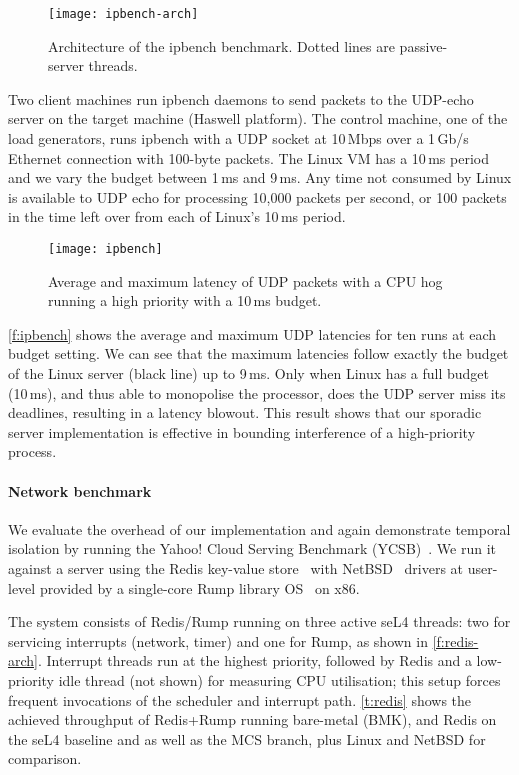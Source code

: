 \begin{figure}[ht]
    \centering
    \texttt{[image: ipbench-arch]}
    \caption{Architecture of the ipbench benchmark. Dotted lines
    are passive-server threads.}
    \label{f:ipbench-arch}
\end{figure}


Two client machines run ipbench daemons to send packets to the UDP-echo server on the target machine
(Haswell platform). The control machine, one of the load generators, runs ipbench with a \gls{UDP} socket at 10\,Mbps over a 1\,Gb/s Ethernet connection with 100-byte packets. The Linux VM has a 10\,ms period and we vary the
budget between 1\,ms and 9\,ms.
Any time not consumed by Linux is available to UDP echo for processing
10,000 packets per second, or 100 packets in the time left over from
each of Linux's 10\,ms period.

\begin{figure}[t]
  \centering
  \texttt{[image: ipbench]}
  \caption{Average and maximum latency of UDP packets with a
    CPU hog running a high priority with a 10\,ms budget.}
  \label{f:ipbench}
\end{figure}

\autoref{f:ipbench} shows the average and maximum UDP latencies for
ten runs at each budget setting. We can see that the maximum latencies
follow exactly the budget of the Linux server (black line) up to 9\,ms. Only
when Linux has a full budget (10\,ms), and thus able to monopolise the
processor, does the UDP server miss its deadlines, resulting in a
latency blowout.  This result shows that our sporadic server implementation is effective in bounding interference of a high-priority process.

\paragraph{Network benchmark} We evaluate the overhead of our implementation and
again demonstrate temporal isolation by running the Yahoo! Cloud Serving Benchmark
(YCSB)~\citep{Cooper_STRS_10}.
 We run it against a server using the Redis
 key-value store~\citep{redis:url} with NetBSD~\citep{NetBSD:url} drivers at user-level provided
 by a single-core Rump library OS~\citep{Kantee_Cormack_14} on x86.

The system consists of Redis/Rump running on three active seL4 threads: two for servicing interrupts
(network, timer) and one for Rump, as shown in \autoref{f:redis-arch}.
Interrupt threads run at the highest priority, followed by Redis and
a low-priority idle thread (not shown) for measuring CPU utilisation;
this setup forces frequent invocations of the scheduler and interrupt
path. \autoref{t:redis} shows the achieved throughput of Redis+Rump
running  bare-metal (BMK), and Redis on the seL4 baseline and as well as the MCS
branch, plus Linux and NetBSD for comparison.

